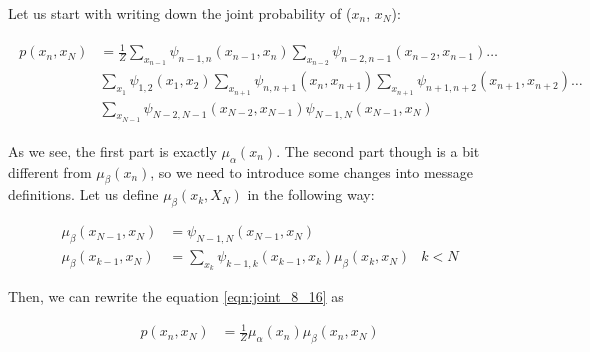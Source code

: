 \documentclass[fleqn]{article}
\begin{document}
Let us start with writing down the joint probability of ($x_n$, $x_N$):

\begin{align}
		\label{eqn:joint_8_16}
	\begin{split}
p(x_n, x_N) &= \frac{1}{Z}\sum\limits_{x_{n-1}}\psi_{n-1,n}(x_{n-1},x_n)\sum\limits_{x_{n-2}}\psi_{n-2,n-1}(x_{n-2},x_{n-1})\ldots\\&\sum\limits_{x_{1}}\psi_{1,2}(x_{1},x_2)\sum\limits_{x_{n+1}}\psi_{n,n+1}(x_{n},x_{n+1})\sum\limits_{x_{n+1}}\psi_{n+1,n+2}(x_{n+1},x_{n+2})\ldots\\&\sum\limits_{x_{N-1}}\psi_{N-2,N-1}(x_{N-2},x_{N-1})\psi_{N-1,N}(x_{N-1},x_N)
	\end{split}
\end{align}

As we see, the first part is exactly $\mu_\alpha(x_n)$. The second part though is a bit different from $\mu_\beta(x_n)$, so we need to introduce some changes into message definitions. Let us define $\mu_\beta(x_k, X_N)$ in the following way:

\begin{align}
	\mu_\beta(x_{N-1}, x_N) & = \psi_{N-1,N}(x_{N-1}, x_N)  & \\
	\mu_\beta(x_{k-1}, x_N) & = \sum\limits_{x_k}\psi_{k-1,k}(x_{k-1}, x_k)\mu_\beta(x_{k}, x_N) & k < N
\end{align}

Then, we can rewrite the equation \ref{eqn:joint_8_16} as 

\begin{align}
	p(x_n, x_N) &= \frac{1}{Z}\mu_\alpha(x_n)\mu_\beta(x_{n}, x_N)
\end{align}
\end{document}

